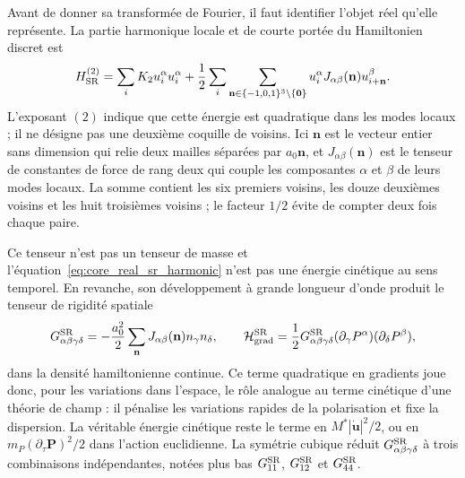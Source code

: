 Avant de donner sa transformée de Fourier, il faut identifier l'objet réel
qu'elle représente. La partie harmonique locale et de courte portée du
Hamiltonien discret est
\begin{equation}
H_{\rm SR}^{(2)}=
\sum_iK_2u_i^\alpha u_i^\alpha
+\frac12\sum_i\sum_{\mathbf n\in\{-1,0,1\}^3\setminus\{\mathbf0\}}
u_i^\alpha J_{\alpha\beta}(\mathbf n)
u_{i+\mathbf n}^\beta .
\label{eq:core_real_sr_harmonic}
\end{equation}
L'exposant $(2)$ indique que cette énergie est quadratique dans les modes
locaux ; il ne désigne pas une deuxième coquille de voisins. Ici $\mathbf n$
est le vecteur entier sans dimension qui relie deux mailles
séparées par $a_0\mathbf n$, et $J_{\alpha\beta}(\mathbf n)$ est le tenseur de
constantes de force de rang deux qui couple les composantes $\alpha$ et
$\beta$ de leurs modes locaux. La somme contient les six premiers voisins,
les douze deuxièmes voisins et les huit troisièmes voisins ; le facteur
$1/2$ évite de compter deux fois chaque paire.

Ce tenseur n'est pas un tenseur de masse et
l'équation~\eqref{eq:core_real_sr_harmonic} n'est pas une énergie cinétique au
sens temporel. En revanche, son développement à grande longueur d'onde produit
le tenseur de rigidité spatiale
\begin{equation}
G^{\rm SR}_{\alpha\beta\gamma\delta}
=-\frac{a_0^2}{2}\sum_{\mathbf n}
J_{\alpha\beta}(\mathbf n)n_\gamma n_\delta,
\qquad
\mathcal H_{\rm grad}^{\rm SR}
=\frac12G^{\rm SR}_{\alpha\beta\gamma\delta}
(\partial_\gamma P^\alpha)(\partial_\delta P^\beta),
\label{eq:core_real_sr_gradient_tensor}
\end{equation}
dans la densité hamiltonienne continue. Ce terme quadratique en gradients joue
donc, pour les variations dans l'espace, le rôle analogue au terme cinétique
d'une théorie de champ : il pénalise les variations rapides de la
polarisation et fixe la dispersion. La véritable énergie cinétique reste le
terme en $M^*|\dot{\mathbf u}|^2/2$, ou en
$m_P(\partial_\tau\mathbf P)^2/2$ dans l'action euclidienne. La symétrie
cubique réduit $G^{\rm SR}_{\alpha\beta\gamma\delta}$ à trois combinaisons
indépendantes, notées plus bas $G_{11}^{\rm SR}$,
$G_{12}^{\rm SR}$ et $G_{44}^{\rm SR}$.

